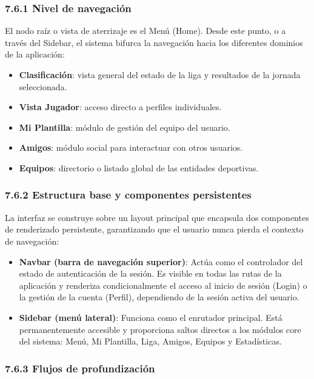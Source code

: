 \subsubsection{7.6.1 Nivel de navegación}
 
El nodo raíz o vista de aterrizaje es el Menú (Home). Desde este punto, o a
través del Sidebar, el sistema bifurca la navegación hacia los diferentes
dominios de la aplicación:
 
\begin{itemize}
\item \textbf{Clasificación}: vista general del estado de la liga y resultados de
la jornada seleccionada.
\item \textbf{Vista Jugador}: acceso directo a perfiles individuales.
\item \textbf{Mi Plantilla}: módulo de gestión del equipo del usuario.
\item \textbf{Amigos}: módulo social para interactuar con otros usuarios.
\item \textbf{Equipos}: directorio o listado global de las entidades deportivas.
\end{itemize}
 
\subsubsection{7.6.2 Estructura base y componentes persistentes}
 
La interfaz se construye sobre un layout principal que encapsula dos componentes
de renderizado persistente, garantizando que el usuario nunca pierda el contexto
de navegación:
 
\begin{itemize}
\item \textbf{Navbar (barra de navegación superior)}: Actúa como el controlador
del estado de autenticación de la sesión. Es visible en todas las rutas de la
aplicación y renderiza condicionalmente el acceso al inicio de sesión (Login) o
la gestión de la cuenta (Perfil), dependiendo de la sesión activa del usuario.
\item \textbf{Sidebar (menú lateral)}: Funciona como el enrutador principal.
 Está permanentemente accesible y proporciona saltos directos a los
módulos core del sistema: Menú, Mi Plantilla, Liga, Amigos, Equipos y Estadísticas.
\end{itemize}
 
\subsubsection{7.6.3 Flujos de profundización}
 
